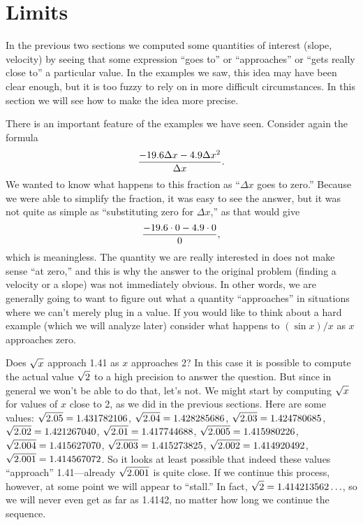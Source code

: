 \section{Limits}{}{}

In the previous two sections we computed some quantities of interest
(slope, velocity) by seeing that some expression ``goes to'' or
``approaches'' or ``gets really close to'' a particular value. In the
examples we saw, this idea may have been clear enough, but it is too
fuzzy to rely on in more difficult circumstances. In this section we
will see how to make the idea more precise.

There is an important feature of the examples we have seen. Consider
again the formula
$${-19.6\Delta x-4.9\Delta x^2\over \Delta x}.
$$
We wanted to know what happens to this fraction as ``$\Delta x$ goes
to zero.'' Because we were able to simplify the fraction, it was easy
to see the answer, but it was not quite as simple as ``substituting
zero for $\Delta x$,'' as that would give
$${-19.6\cdot 0 - 4.9\cdot 0\over 0},$$
which is meaningless. The quantity we are really interested in does
not make sense ``at zero,'' and this is why the answer to the original
problem (finding a velocity or a slope) was not immediately obvious. In
other words, we are generally going to want to figure out what a
quantity ``approaches'' in situations where we can't merely plug in a
value. If you would like to think about a hard example (which we will
analyze later) consider what happens to $(\sin x)/x$ as $x$ approaches
zero. 

\example
Does $\displaystyle \sqrt{x}$ approach 1.41 as $x$ approaches 2? In this case it
is possible to compute the actual value $\displaystyle \sqrt{2}$ to a high precision
to answer the question. But since in general we won't be able to do
that, let's not. We might start by computing $\displaystyle \sqrt{x}$ for values of
$x$ close to 2, as we did in the previous sections. Here are some
values: $\displaystyle \sqrt{2.05} = 1.431782106$,
        $\displaystyle \sqrt{2.04} = 1.428285686$,
        $\displaystyle \sqrt{2.03} = 1.424780685$,
        $\displaystyle \sqrt{2.02} = 1.421267040$,
        $\displaystyle \sqrt{2.01} = 1.417744688$,
        $\displaystyle \sqrt{2.005} = 1.415980226$,
        $\displaystyle \sqrt{2.004} = 1.415627070$,
        $\displaystyle \sqrt{2.003} = 1.415273825$,
        $\displaystyle \sqrt{2.002} = 1.414920492$,
        $\displaystyle \sqrt{2.001} = 1.414567072$.
So it looks at least possible that indeed these values ``approach''
1.41---already $\displaystyle \sqrt{2.001}$ is quite close. If we continue this
process, however, at some point we will appear to ``stall.'' In fact, 
$\displaystyle \sqrt{2}=1.414213562\ldots$, so we will never even get as far as
1.4142, no matter how long we continue the sequence. 
\endexample

